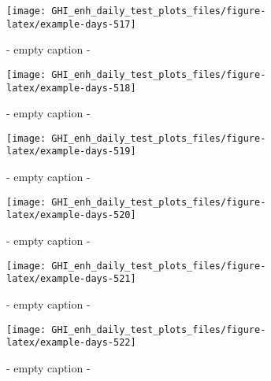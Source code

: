 \documentclass[
  10pt,
  a4paper,oneside]{article}
\begin{document}
\begin{figure}[H]

{\centering \texttt{[image: GHI\_enh\_daily\_test\_plots\_files/figure-latex/example-days-517]} 

}

\caption{ - empty caption - }\label{fig:example-days-517}
\end{figure}

\begin{figure}[H]

{\centering \texttt{[image: GHI\_enh\_daily\_test\_plots\_files/figure-latex/example-days-518]} 

}

\caption{ - empty caption - }\label{fig:example-days-518}
\end{figure}

\begin{figure}[H]

{\centering \texttt{[image: GHI\_enh\_daily\_test\_plots\_files/figure-latex/example-days-519]} 

}

\caption{ - empty caption - }\label{fig:example-days-519}
\end{figure}

\begin{figure}[H]

{\centering \texttt{[image: GHI\_enh\_daily\_test\_plots\_files/figure-latex/example-days-520]} 

}

\caption{ - empty caption - }\label{fig:example-days-520}
\end{figure}

\begin{figure}[H]

{\centering \texttt{[image: GHI\_enh\_daily\_test\_plots\_files/figure-latex/example-days-521]} 

}

\caption{ - empty caption - }\label{fig:example-days-521}
\end{figure}

\begin{figure}[H]

{\centering \texttt{[image: GHI\_enh\_daily\_test\_plots\_files/figure-latex/example-days-522]} 

}

\caption{ - empty caption - }\label{fig:example-days-522}
\end{figure}
\end{document}
